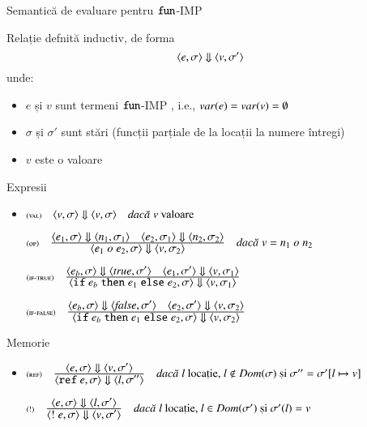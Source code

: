\documentclass[xcolor=pdftex,romanian,colorlinks]{beamer}
\begin{document}
\begin{section}{Semantică de evaluare pentru $\mathrel{\text{\ttfamily fun}}$-IMP}

\begin{frame}{}
 Relație defnită inductiv, de forma 
\[ \displaystyle{\ensuremath {{\langle{e,\sigma}\rangle}} \Downarrow {{\ensuremath \langle{v,\sigma'}\rangle}}}\]
unde:
\begin{itemize}
\item $e$ și $v$ sunt termeni $\mathrel{\text{\ttfamily fun}}$-IMP , i.e., $\mathop{var}(e) = \mathop{var}(v) = \emptyset$
\item $\sigma$ și $\sigma'$ sunt stări (funcții parțiale de la locații la numere întregi)
\item $v$ este o valoare 
\begin{syntaxBlock}{}
\renewcommand{\syntaxKeyword}{}
\end{syntaxBlock}
\end{itemize}
\end{frame}

\begin{frame}
{Expresii}
\begin{itemize}
\item[] $\reg[val]{\S{\c{v,\sigma}}{\c{v,\sigma}}}{}{v \mbox{ valoare}}$

\vitem[]
$\reg[op]{\S{\c{e_1\mathrel{o} e_2,\sigma}}{\c{v,\sigma_2}}}{\S{\c{e_1,\sigma}}{\c{n_1, \sigma_1}}\si \S{\c{e_2,\sigma_1}}{\c{n_2, \sigma_2}}}{v = n_1 \mathrel{o} n_2}$

\vitem[]
$\reg[if-true]{\S{\c{\Sif e_b \Sthen e_1 \Selse e_2,\sigma}}{\c{v,\sigma_1}}}{\S{\c{e_b,\sigma}}{\c{\Strue, \sigma'}}\si \S{\c{e_1,\sigma'}}{\c{v, \sigma_1}}}{}$

\vitem[]
$\reg[if-false]{\S{\c{\Sif e_b \Sthen e_1 \Selse e_2,\sigma}}{\c{v,\sigma_2}}}{\S{\c{e_b,\sigma}}{\c{\Sfalse, \sigma'}}\si \S{\c{e_2,\sigma'}}{\c{v, \sigma_2}}}{}$

\end{itemize}
\end{frame}

\begin{frame}
{Memorie}
\begin{itemize}
\item[]
$\reg[ref]{\S{\c{{\Sref e},\sigma}}{\c{l,\sigma''}}}{\S{\c{e,\sigma}}{\c{v,\sigma'}}}{l \mbox{ locație, $l\not\in Dom(\sigma)$ și $\sigma'' = \sigma'[l \mapsto v]$}}$

\vitem[]
$\reg[!]{\S{\c{{\mathrel{!} e},\sigma}}{\c{v,\sigma'}}}{\S{\c{e,\sigma}}{\c{l,\sigma'}}}{l \mbox{ locație, $l\in Dom(\sigma')$ și $\sigma'(l)=v$}}$


\end{itemize}
\end{frame}
\end{section}
\end{document}
